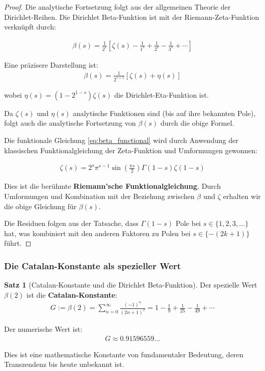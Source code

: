 \documentclass[a4paper,12pt,twoside]{report}
\theoremstyle{definition}
\newtheorem{satz}{Satz}
\begin{document}
\begin{proof}
Die analytische Fortsetzung folgt aus der allgemeinen Theorie der Dirichlet-Reihen. Die Dirichlet Beta-Funktion ist mit der Riemann-Zeta-Funktion verknüpft durch:

\begin{align}
	\beta(s) = \frac{1}{2^s} \left[ \zeta(s) - \frac{1}{1^s} + \frac{1}{2^s} - \frac{1}{3^s} + \cdots \right]
\end{align}

Eine präzisere Darstellung ist:
\begin{align}
	\beta(s) = \frac{1}{2^{s+1}} \left[ \zeta(s) + \eta(s) \right]
\end{align}

wobei $\eta(s) = (1 - 2^{1-s}) \zeta(s)$ die Dirichlet-Eta-Funktion ist.

Da $\zeta(s)$ und $\eta(s)$ analytische Funktionen sind (bis auf ihre bekannten Pole), folgt auch die analytische Fortsetzung von $\beta(s)$ durch die obige Formel.

Die funktionale Gleichung \eqref{eq:beta_functional} wird durch Anwendung der klassischen Funktionalgleichung der Zeta-Funktion und Umformungen gewonnen:

\begin{align}
	\zeta(s) = 2^s \pi^{s-1} \sin\left(\frac{\pi s}{2}\right) \Gamma(1-s) \zeta(1-s)
\end{align}

Dies ist die berühmte \textbf{Riemann'sche Funktionalgleichung}. Durch Umformungen und Kombination mit der Beziehung zwischen $\beta$ und $\zeta$ erhalten wir die obige Gleichung für $\beta(s)$.

Die Residuen folgen aus der Tatsache, dass $\Gamma(1-s)$ Pole bei $s \in \{1, 2, 3, \ldots\}$ hat, was kombiniert mit den anderen Faktoren zu Polen bei $s \in \{-(2k+1)\}$ führt.
\end{proof}

\subsubsection{Die Catalan-Konstante als spezieller Wert}

\begin{satz}[Catalan-Konstante und die Dirichlet Beta-Funktion]
Der spezielle Wert $\beta(2)$ ist die \textbf{Catalan-Konstante}:
\begin{align}
	G := \beta(2) = \sum_{n=0}^{\infty} \frac{(-1)^n}{(2n+1)^2} = 1 - \frac{1}{9} + \frac{1}{25} - \frac{1}{49} + \cdots
	\label{eq:catalan_constant}
\end{align}

Der numerische Wert ist:
\begin{align}
	G \approx 0.91596559\ldots
\end{align}

Dies ist eine mathematische Konstante von fundamentaler Bedeutung, deren Transzendenz bis heute unbekannt ist.
\end{satz}
\end{document}
